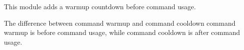 
This module adds a warmup countdown before command usage.

\begin{note}{The difference between command warmup and command cooldown}
    command warmup is before command usage, while command cooldown is after command usage.
\end{note}

